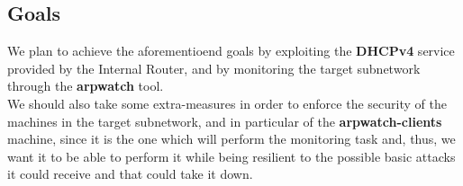 \subsection{Goals}
We plan to achieve the aforementioend goals by exploiting the \textbf{DHCPv4} service provided by the Internal Router, and by monitoring the target subnetwork through the \textbf{arpwatch} tool.\\
We should also take some extra-measures in order to enforce the security of the machines in the target subnetwork, and in particular of the \textbf{arpwatch-clients} machine, since it is the one which will perform the monitoring task and, thus, we want it to be able to perform it while being resilient to the possible basic attacks it could receive and that could take it down.
